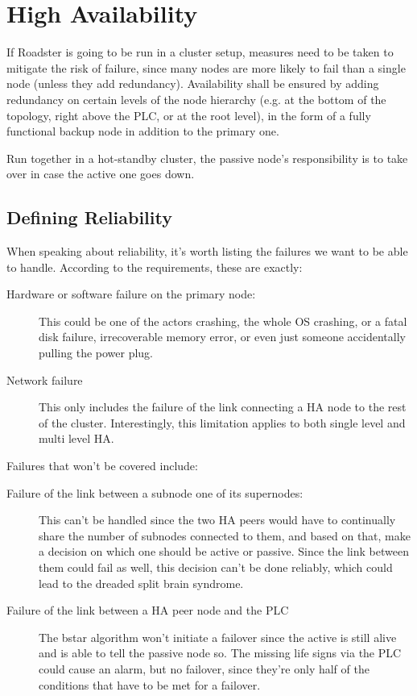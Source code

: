 \section{High Availability}\label{sec:meth:ha}
If Roadster is going to be run in a cluster setup, measures need to be taken to
mitigate the risk of failure, since many nodes are more likely to fail than a
single node (unless they add redundancy). Availability shall be ensured by
adding redundancy on certain levels of the node hierarchy (e.g. at the bottom
of the topology, right above the PLC, or at the root level), in the form of a
fully functional backup node in addition to the primary one.

Run together in a hot-standby cluster, the passive node's responsibility is to
take over in case the active one goes down.

\subsection{Defining Reliability}
When speaking about reliability, it's worth listing the failures we want to be
able to handle. According to the requirements, these are exactly:

\begin{description}
	\item [Hardware or software failure on the primary node:]
		This could be one of the actors crashing, the whole OS
		crashing, or a fatal disk failure, irrecoverable memory error,
		or even just someone accidentally pulling the power plug.

	\item [Network failure]
		This only includes the failure of the link connecting a HA node
		to the rest of the cluster.  Interestingly, this limitation applies to both
		single level and multi level HA.
\end{description}

Failures that won't be covered include:
\begin{description}
	\item [Failure of the link between a subnode one of its supernodes:]

		This can't be handled since the two HA peers would have to
		continually share the number of subnodes connected to them, and
		based on that, make a decision on which one should be active or
		passive. Since the link between them could fail as well, this
		decision can't be done reliably, which could lead to the
		dreaded split brain syndrome.

	\item [Failure of the link between a HA peer node and the PLC]
		The \gls{bstar} algorithm won't initiate a failover since the
		active is still alive and is able to tell the passive node so.
		The missing life signs via the PLC could cause an alarm, but no
		failover, since they're only half of the conditions that have
		to be met for a failover.
\end{description}

